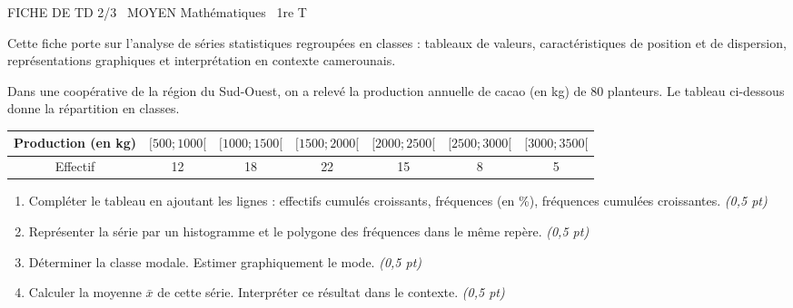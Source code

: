 \documentclass[11pt]{article}
\begin{document}
\begin{tcolorbox}[enhanced,colback=popink,colframe=popink,arc=10pt,boxrule=0pt,left=12pt,right=12pt,top=9pt,bottom=9pt]
{\color{white}\popxbold\small FICHE DE TD 2/3 \textbullet\ MOYEN \hfill Mathématiques \textbullet\ 1re T\par}
\end{tcolorbox}
\vspace{4pt}
Cette fiche porte sur l'analyse de séries statistiques regroupées en classes : tableaux de valeurs, caractéristiques de position et de dispersion, représentations graphiques et interprétation en contexte camerounais.

\begin{exercice}
Dans une coopérative de la région du Sud-Ouest, on a relevé la production annuelle de cacao (en kg) de 80 planteurs. Le tableau ci-dessous donne la répartition en classes.
\begin{center}
\begin{tabular}{|c|c|c|c|c|c|c|}
\hline
Production (en kg) & $[500; 1000[$ & $[1000; 1500[$ & $[1500; 2000[$ & $[2000; 2500[$ & $[2500; 3000[$ & $[3000; 3500[$ \\ \hline
Effectif & 12 & 18 & 22 & 15 & 8 & 5 \\ \hline
\end{tabular}
\end{center}
\begin{enumerate}
    \item Compléter le tableau en ajoutant les lignes : effectifs cumulés croissants, fréquences (en \%), fréquences cumulées croissantes. \textit{(0,5 pt)}
    \item Représenter la série par un histogramme et le polygone des fréquences dans le même repère. \textit{(0,5 pt)}
    \item Déterminer la classe modale. Estimer graphiquement le mode. \textit{(0,5 pt)}
    \item Calculer la moyenne $\bar{x}$ de cette série. Interpréter ce résultat dans le contexte. \textit{(0,5 pt)}
\end{enumerate}
\end{exercice}
\end{document}
